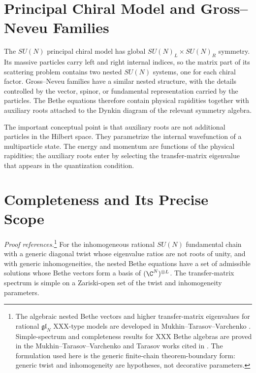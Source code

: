 \section{Principal Chiral Model and Gross--Neveu Families}

The \(SU(N)\) principal chiral model has global
\(SU(N)_L\times SU(N)_R\) symmetry.  Its massive particles carry left and
right internal indices, so the matrix part of its scattering problem contains
two nested \(SU(N)\) systems, one for each chiral factor.  Gross--Neveu
families have a similar nested structure, with the details controlled by the
vector, spinor, or fundamental representation carried by the particles.  The
Bethe equations therefore contain physical rapidities together with auxiliary
roots attached to the Dynkin diagram of the relevant symmetry algebra.

The important conceptual point is that auxiliary roots are not additional
particles in the Hilbert space.  They parametrize the internal wavefunction
of a multiparticle state.  The energy and momentum are functions of the
physical rapidities; the auxiliary roots enter by selecting the
transfer-matrix eigenvalue that appears in the quantization condition.

\section{Completeness and Its Precise Scope}

\begin{quotedtheorem}
\label{qthm:generic-nested-bethe-completeness}
\emph{Proof references.}\footnote{The algebraic nested Bethe vectors and
higher transfer-matrix eigenvalues for rational \(\mathfrak{gl}_N\)
XXX-type models are developed in Mukhin--Tarasov--Varchenko
\cite{MTV2006BetheEigenvectors}.  Simple-spectrum and completeness results
for XXX Bethe algebras are proved in the Mukhin--Tarasov--Varchenko and
Tarasov works cited in
\cite{MTV2009XXXSimpleSpectrum,Tarasov2018Completeness}.  The formulation
used here is the generic finite-chain theorem-boundary form: generic twist
and inhomogeneity are hypotheses, not decorative parameters.}
For the inhomogeneous rational \(SU(N)\) fundamental chain with a generic
diagonal twist whose eigenvalue ratios are not roots of unity, and with
generic inhomogeneities, the nested Bethe equations have a set of admissible
solutions whose Bethe vectors form a basis of \((\C^N)^{\otimes L}\).  The
transfer-matrix spectrum is simple on a Zariski-open set of the twist and
inhomogeneity parameters.
\end{quotedtheorem}

